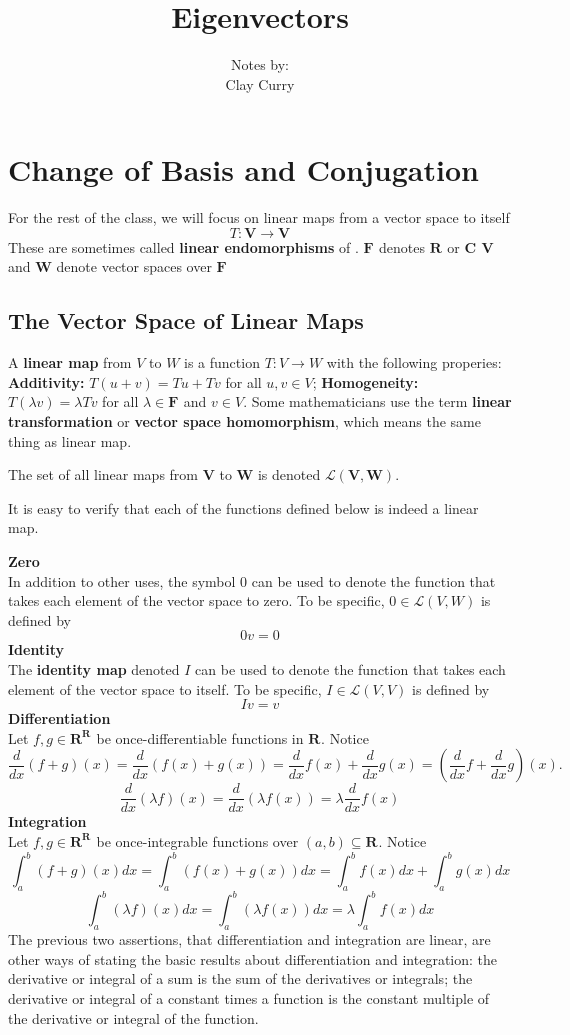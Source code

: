 \documentclass[11pt]{article} %
\title{Eigenvectors}
\author{Notes by:  \\ Clay Curry}
\date{}
\newcommand\R[1]{\text{$\mathbf{R^{#1}}$}}
\newcommand\C[1]{\text{$\mathbf{C^{#1}}$}}
\newcommand\F[1]{\text{$\mathbf{F^{#1}}$}}
\newcommand\V{\text{$\mathbf{V}$}}
\newcommand\W{\text{$\mathbf{W}$}}
\newcommand\0{\text{$\mathbf{0}$}}
\renewcommand\L[2]{\mathcal{L}(#1,#2)}
\begin{document}
\section{Change of Basis and Conjugation}

{For the rest of the class, we will focus on linear maps from a vector space to itself
$$T : \V \to \V$$
These are sometimes called \textbf{linear endomorphisms} of \V.
}
{\points
{$\F{}$ denotes $\R{}$ or $\C{}$}
{$\V$ and $\W$ denote vector spaces over $\F{}$}
}

\subsection{The Vector Space of Linear Maps}
{
A \textbf{linear map} from $V$ to $W$ is a function $T : V \to W$ with the following properies:
\points
{\textbf{Additivity: } $T(u+v) = Tu + Tv$ for all $u, v \in V$;}
{\textbf{Homogeneity: } $T(\lambda v) = \lambda Tv$ for all $\lambda \in \F{}$ and $v \in V$.}
}
Some mathematicians use the term \textbf{linear transformation} or \textbf{vector space homomorphism}, which means the same thing as linear map. 

\definition{$\L{V}{W}$}
{The set of all linear maps from $\V$ to $\W$ is denoted $\L{\V}{\W}$.}

It is easy to verify that each of the functions defined below is indeed a linear map.

{
\textbf{Zero}\\
In addition to other uses, the symbol $0$ can be used to denote the function that takes each element of the vector space to zero. To be specific, $0 \in \L{V}{W}$ is defined by $$0v = 0$$
\textbf{Identity}\\
The \textbf{identity map} denoted $I$ can be used to denote the function that takes each element of the vector space to itself. To be specific, $I \in \L{V}{V}$ is defined by $$Iv = v$$
\textbf{Differentiation}\\
Let $f, g \in \R{\R{}}$ be once-differentiable functions in $\R{}$. Notice 
$$\frac{d}{dx}(f + g)(x) =  \frac{d}{dx}(f(x) + g(x)) = \frac{d}{dx}f(x) + \frac{d}{dx}g(x) = (\frac{d}{dx}f + \frac{d}{dx}g)(x).$$
$$\frac{d}{dx}(\lambda f)(x) = \frac{d}{dx}(\lambda f(x)) = \lambda \frac{d}{dx}f(x)$$
\textbf{Integration}\\
Let $f, g \in \R{\R{}}$ be once-integrable functions over $(a,b) \subseteq \R{}$. Notice 
$$\int_a^b (f + g)(x) dx =  \int_a^b (f(x) + g(x)) dx = \int_a^b f(x) dx + \int_a^b g(x)dx$$
$$\int_a^b (\lambda f)(x) dx = \int_a^b (\lambda f(x)) dx= \lambda \int_a^b f(x) dx$$
}
The previous two assertions, that differentiation and integration are linear, are other ways of stating the basic results about differentiation and integration: the derivative or integral of a sum is the sum of the derivatives or integrals; the derivative or integral of a constant times a function is the constant multiple of the derivative or integral of the function.
\end{document}
